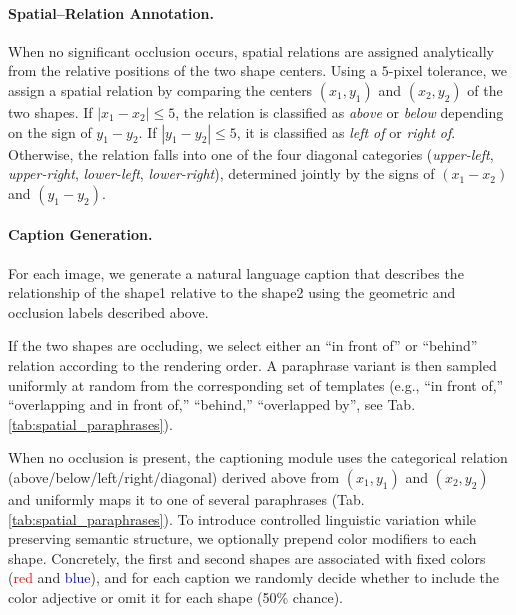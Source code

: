\paragraph{Spatial–Relation Annotation.}
When no significant occlusion occurs, spatial relations are assigned analytically from the relative positions of the two shape centers. %
Using a $5$-pixel tolerance, we assign a spatial relation by comparing the centers $(x_1,y_1)$ and $(x_2,y_2)$ of the two shapes. If $|x_1 - x_2| \le 5$, the relation is classified as \emph{above} or \emph{below} depending on the sign of $y_1 - y_2$. If $|y_1 - y_2| \le 5$, it is classified as \emph{left of} or \emph{right of}. Otherwise, the relation falls into one of the four diagonal categories (\emph{upper-left}, \emph{upper-right}, \emph{lower-left}, \emph{lower-right}), determined jointly by the signs of $(x_1 - x_2)$ and $(y_1 - y_2)$.

\paragraph{Caption Generation.}
For each image, we generate a natural language caption that describes the relationship of the shape1 relative to the shape2 using the geometric and occlusion labels described above. 

If the two shapes are occluding, we select either an ``in front of'' or ``behind'' relation according to the rendering order. A paraphrase variant is then sampled uniformly at random from the corresponding set of templates (e.g., ``in front of,'' ``overlapping and in front of,'' ``behind,'' ``overlapped by'', see Tab.\ref{tab:spatial_paraphrases}).

When no occlusion is present, the captioning module uses the categorical relation (above/below/left/right/diagonal) derived above from $(x_1,y_1)$ and $(x_2,y_2)$ and uniformly maps it to one of several paraphrases (Tab. \ref{tab:spatial_paraphrases}). 
To introduce controlled linguistic variation while preserving semantic structure, we optionally prepend color modifiers to each shape. 
Concretely, the first and second shapes are associated with fixed colors (\textcolor{red}{red} and \textcolor{blue}{blue}), and for each caption we randomly decide whether to include the color adjective or omit it for each shape (50\% chance).

